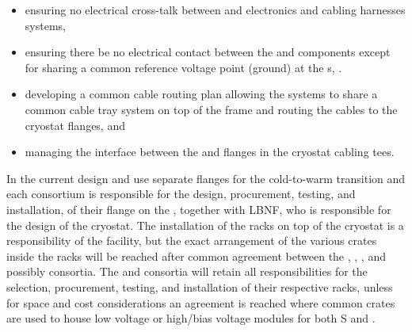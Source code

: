 \begin{itemize}
    \item ensuring no electrical cross-talk between  and  electronics and cabling harnesses systems,
    \item ensuring there be no electrical contact between the  and  components except for sharing a common reference voltage point (ground) at the \fdth{}s,  .
    \item developing a common cable routing plan allowing the systems to share a common cable tray system on top of the  frame and routing the cables to the cryostat flanges, and 



    \item managing the interface between the  and  flanges in the cryostat cabling tees.
  
  \end{itemize}  
In the current design  and  use separate flanges for the cold-to-warm transition and each consortium is responsible for the design, procurement, testing, and installation, of their flange on the \fdth{}, together with LBNF, who is responsible for the design of the cryostat. 
The installation of the racks on top of the cryostat is a responsibility of the facility, but the exact arrangement of the various crates inside the racks will be reached after common agreement between the , , , and possibly  consortia. The  and  consortia will retain all responsibilities for the selection, procurement, testing, and installation of their respective racks, unless for space and cost considerations an agreement is reached where common crates are used to house low voltage or high/bias voltage modules for both S and . 



